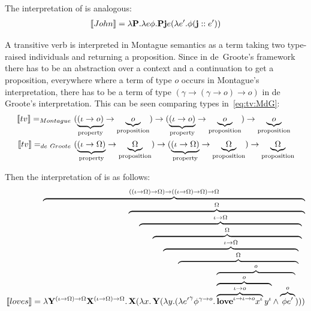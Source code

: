 The interpretation of  is analogous:
\begin{align}
\I{John} = \lambda \P2. \lambda e \phi. \P2 \textbf{j} e (\lambda e' .\phi (\textbf{j}::{e'})) \label{eq:dG:John}
\end{align}

A transitive verb is interpreted in Montague semantics as a term taking two type-raised individuals and returning a proposition.  Since in de~Groote's framework there has to be an abstraction over a context and a continuation to get a proposition,  everywhere where a term of type $o$ occurs in Montague's interpretation, there has to be a term of type $(\gamma \rightarrow (\gamma \rightarrow o) \rightarrow o)$ in de Groote's interpretation. This can be seen comparing types in~\eqref{eq:tv:MdG}:
\begin{subequations}
\begin{align}
\I{tv} =_{Montague} \ & (\underbrace{(\iota \rightarrow   o)}_{\text{property}} \rightarrow \underbrace{o}_{\text{proposition}}) \rightarrow (\underbrace{(\iota \rightarrow   o)}_{\text{property}} \rightarrow \underbrace{o}_{\text{proposition}})  \rightarrow \underbrace{o}_{\text{proposition}} \\
\I{tv} =_{de~Groote} \ &  (\underbrace{(\iota \rightarrow   \Omega)}_{\text{property}} \rightarrow \underbrace{\Omega}_{\text{proposition}}) \rightarrow (\underbrace{(\iota \rightarrow   \Omega)}_{\text{property}} \rightarrow \underbrace{\Omega}_{\text{proposition}})  \rightarrow \underbrace{\Omega}_{\text{proposition}} 
\end{align} \label{eq:tv:MdG}
\end{subequations}

Then the interpretation of  is as follows:
\begin{align}
\I{loves} = \overbrace{\lambda \Y2^{(\iota \rightarrow \Omega) \rightarrow \Omega} \X2^{(\iota \rightarrow \Omega) \rightarrow \Omega}.  \overbrace{\X2 ( \overbrace{\lambda \x1.  \overbrace{\Y2 ( \overbrace{\lambda \y1. (  \overbrace{\lambda {e'}^{\gamma} \phi^{\gamma \rightarrow o}. \overbrace{\overbrace{\overbrace{{\textbf{love}}^{\iota \rightarrow \iota \rightarrow o} {\x1}^{\iota}}^{\iota \rightarrow o} {\y1}^{\iota}}^{o} \land \overbrace{\phi e'}^{o}}^{o} )}^{\Omega}}^{\iota \rightarrow \Omega} )}^{\Omega}}^{\iota \rightarrow \Omega} )}^{\Omega} }^{((\iota \rightarrow \Omega) \rightarrow \Omega) \rightarrow ((\iota \rightarrow \Omega) \rightarrow \Omega) \rightarrow \Omega} \label{eq:dG:love}
\end{align}



